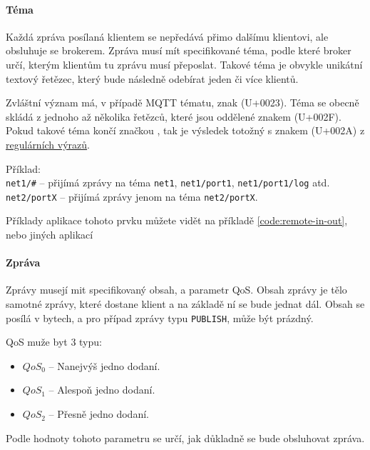\paragraph{Téma}
\label{par:topic}

Každá zpráva posílaná klientem se nepředává přimo dalšímu klientovi, ale obsluhuje se brokerem. Zpráva musí mít specifikované téma, podle které broker určí, kterým klientům tu zprávu musí přeposlat. Takové téma je obvykle unikátní textový řetězec, který bude následně odebírat jeden či více klientů.

Zvláštní význam má, v případě MQTT tématu, znak \uv{\#} (U+0023). Téma se obecně skládá z jednoho až několika řetězců, které jsou oddělené znakem \uv{/} (U+002F). Pokud takové téma končí značkou \uv{\#}, tak je výsledek totožný s  znakem \uv{*} (U+002A) z \href{https://en.wikipedia.org/wiki/Regular_expression}{regulárních výrazů}.

\begin{tabbing}
Příklad: \= \\
\> \texttt{net1/\#} -- přijímá zprávy na téma \texttt{net1}, \texttt{net1/port1}, \texttt{net1/port1/log} atd.\\
\> \texttt{net2/portX} -- přijímá zprávy jenom na téma \texttt{net2/portX}. \\
\end{tabbing}

Příklady aplikace tohoto prvku můžete vidět na příkladě \ref{code:remote-in-out}, nebo jiných aplikací \

\paragraph{Zpráva}
\label{par:message}

Zprávy musejí mit specifikovaný obsah, a parametr QoS. Obsah zprávy je tělo samotné zprávy, které dostane klient a na základě ní se bude jednat dál. Obsah se posílá v bytech, a pro případ zprávy typu \texttt{PUBLISH}, může být prázdný.

QoS muže byt 3 typu:
\begin{itemize}
 \item $QoS_0$ -- Nanejvýš jedno dodaní.
 \item $QoS_1$ -- Alespoň jedno dodaní.
 \item $QoS_2$ -- Přesně jedno dodaní.
\end{itemize}

Podle hodnoty tohoto parametru se určí, jak důkladně se bude obsluhovat zpráva.

